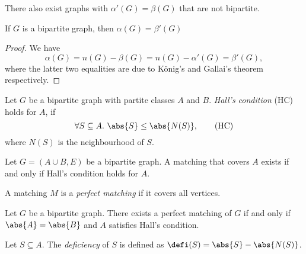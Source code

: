
\begin{remark}
    There also exist graphs with $\alpha'(G) = \beta(G)$ that are not bipartite.
\end{remark}

\begin{corollary}
    If $G$ is a bipartite graph, then $\alpha(G) = \beta'(G)$
\end{corollary}

\begin{proof}
    We have
    \[
        \alpha(G) = n(G) - \beta(G) = n(G) - \alpha'(G) = \beta'(G),
    \]
    where the latter two equalities are due to König's and Gallai's 
    theorem respectively.
\end{proof}

\begin{definition}
    Let $G$ be a bipartite graph with partite classes $A$ and $B$. 
    \emph{Hall's condition} (HC) holds for $A$,
    if 
    \begin{equation}
        \forall S \subseteq A.~\abs{S} \le \abs{N(S)},
        \tag{HC}
        \label{eq:HC}
    \end{equation}
    where $N(S)$ is the neighbourhood of $S$.
\end{definition}

\begin{theorem}[Hall]
    Let $G = (A \cup B, E)$ be a bipartite graph. A matching that covers $A$ 
    exists if and only if Hall's condition holds for $A$.
\end{theorem}


\begin{definition}
    A matching $M$ is a \emph{perfect matching} if 
    it covers all vertices.
\end{definition}

\begin{corollary}
    Let $G$ be a bipartite graph. There exists a perfect matching of $G$ 
    if and only if $\abs{A} = \abs{B}$ and $A$ satisfies Hall's condition.
\end{corollary}

\begin{definition}
    Let $S \subseteq A$. The \emph{deficiency} of $S$ is 
    defined as $\defi(S) = \abs{S} - \abs{N(S)}$.
\end{definition}

